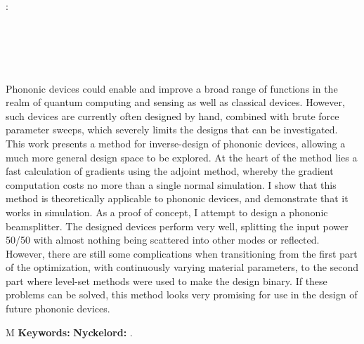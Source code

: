 \thesisImprintTitle:\\
\thesisImprintSubtitle\\[1ex]
\thesisAuthor\\
\thesisDepartment\\
\thesisUniversity

\thispagestyle{plain}           %
\section*{\abstractname}
Phononic devices could enable and improve a broad range of functions in
the realm of quantum computing and sensing as well as classical devices.
However, such devices are currently often designed by hand, combined with brute force
parameter sweeps, which severely limits the designs that can be investigated.
This work presents a method for inverse-design of phononic devices,
allowing a much more general design space to be explored.
At the heart of the method lies a fast calculation of gradients using the
adjoint method, whereby the gradient computation costs no more than a single
normal simulation.
I show that this method is theoretically applicable to phononic devices,
and demonstrate that it works in simulation.
As a proof of concept, I attempt to design a phononic beamsplitter.
The designed devices perform very well, splitting the input power 50/50 with
almost nothing being scattered into other modes or reflected.
However, there are still some complications when transitioning from the first
part of the optimization, with continuously varying material parameters,
to the second part where level-set methods were used to make the design binary.
If these problems can be solved,
this method looks very promising for use in the design of future phononic devices.

\if\thesisType M
    \textbf{Keywords:}
\else
    \textbf{Nyckelord:}
\fi
\thesisKeywords.

\if{}
\newpage                %
\thispagestyle{empty}
\mbox{}
\fi
